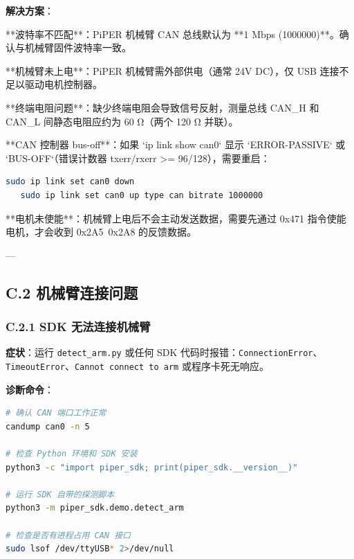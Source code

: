 \documentclass[UTF8,a4paper,11pt]{ctexart}
\begin{document}
{\textbf{解决方案}：
\item[1] **波特率不匹配**：PiPER 机械臂 CAN 总线默认为 **1 Mbps (1000000)**。确认与机械臂固件波特率一致。
\item[2] **机械臂未上电**：PiPER 机械臂需外部供电（通常 24V DC），仅 USB 连接不足以驱动电机控制器。
\item[3] **终端电阻问题**：缺少终端电阻会导致信号反射，测量总线 CAN_H 和 CAN_L 间静态电阻应约为 60 Ω（两个 120 Ω 并联）。
\item[4] **CAN 控制器 bus-off**：如果 `ip link show can0` 显示 `ERROR-PASSIVE` 或 `BUS-OFF`（错误计数器 txerr/rxerr >= 96/128），需要重启：
\begin{lstlisting}[language=bash]
   sudo ip link set can0 down
   sudo ip link set can0 up type can bitrate 1000000
\end{lstlisting}
\item[5] **电机未使能**：机械臂上电后不会主动发送数据，需要先通过 0x471 指令使能电机，才会收到 0x2A5~0x2A8 的反馈数据。

---

\subsection{C.2 机械臂连接问题}

\subsubsection{C.2.1 SDK 无法连接机械臂}

\textbf{症状}：运行 \texttt{detect_arm.py} 或任何 SDK 代码时报错：\texttt{ConnectionError}、\texttt{TimeoutError}、\texttt{Cannot connect to arm} 或程序卡死无响应。

\textbf{诊断命令}：
\begin{lstlisting}[language=bash]
# 确认 CAN 端口工作正常
candump can0 -n 5

# 检查 Python 环境和 SDK 安装
python3 -c "import piper_sdk; print(piper_sdk.__version__)"

# 运行 SDK 自带的探测脚本
python3 -m piper_sdk.demo.detect_arm

# 检查是否有进程占用 CAN 接口
sudo lsof /dev/ttyUSB* 2>/dev/null
\end{lstlisting}

}
\end{document}
